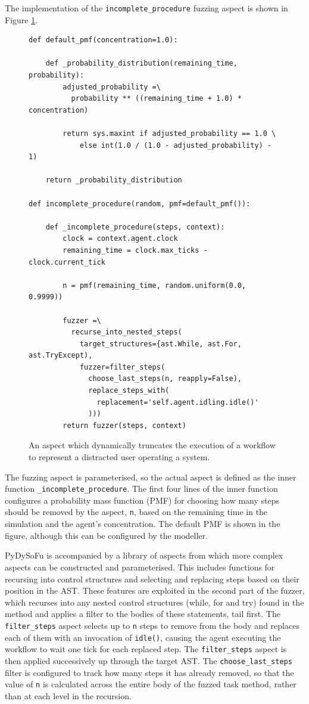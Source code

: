 \documentclass{llncs}
\begin{document}
The implementation of the \lstinline!incomplete_procedure! fuzzing aspect is shown in Figure
\ref{fig:distraction-fuzzer}.%
\begin{figure}[t]
  \centering
\begin{lstlisting}
def default_pmf(concentration=1.0):

    def _probability_distribution(remaining_time, probability):
        adjusted_probability =\
          probability ** ((remaining_time + 1.0) * concentration)

        return sys.maxint if adjusted_probability == 1.0 \
            else int(1.0 / (1.0 - adjusted_probability) - 1)

    return _probability_distribution

def incomplete_procedure(random, pmf=default_pmf()):

    def _incomplete_procedure(steps, context):
        clock = context.agent.clock
        remaining_time = clock.max_ticks - clock.current_tick

        n = pmf(remaining_time, random.uniform(0.0, 0.9999))

        fuzzer =\
          recurse_into_nested_steps(
            target_structures={ast.While, ast.For, ast.TryExcept),
            fuzzer=filter_steps(
              choose_last_steps(n, reapply=False),
              replace_steps_with(
                replacement='self.agent.idling.idle()'
              )))
        return fuzzer(steps, context)
\end{lstlisting}
  \caption{An aspect which dynamically truncates the execution of a workflow to represent a distracted user operating a
    system.}
  \label{fig:distraction-fuzzer}
\end{figure}
The fuzzing aspect is parameterised, so the actual aspect is defined as the inner function
\lstinline!_incomplete_procedure!.  The first four lines of the inner function configures a probability mass function
(PMF) for choosing how many steps should be removed by the aspect, \lstinline!n!, based on the remaining time in the
simulation and the agent's concentration. The default PMF is shown in the figure, although this can be configured by the
modeller.

PyDySoFu is accompanied by a library of aspects from which more complex aspects can be constructed and parameterised.
This includes functions for recursing into control structures and selecting and replacing steps based on their position
in the AST.  These features are exploited in the second part of the fuzzer, which recurses into any nested control
structures (while, for and try) found in the method and applies a filter to the bodies of these statements, tail first.
The \lstinline!filter_steps! aspect selects up to \lstinline!n! steps to remove from the body and replaces each of them
with an invocation of \lstinline!idle()!, causing the agent executing the workflow to wait one tick for each replaced
step.  The \lstinline!filter_steps! aspect is then applied successively up through the target AST.  The
\lstinline!choose_last_steps! filter is configured to track how many steps it has already removed, so that the value of
\lstinline!n! is calculated across the entire body of the fuzzed task method, rather than at each level in the
recursion.
\end{document}
